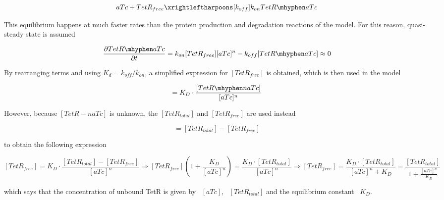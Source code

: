\begin{equation}
    aTc + TetR_{free} \xrightleftharpoons[k_{off}]{k_{on}} TetR \mhyphen aTc
\end{equation}

This equilibrium happens at much faster rates than the protein production and degradation reactions of the model.
For this reason, quasi-steady state is assumed

\begin{equation}
    \pdv{TetR \mhyphen aTc}{t} = k_{on}[TetR_{free}][aTc]^n - k_{off}[TetR \mhyphen aTc] \approx 0
\end{equation}


By rearranging terms and using $K_{d} = k_{off}/k_{on}$, a simplified expression for $[TetR_{free}]$ is obtained,
which is then used in the model

\begin{equation}
[TetR_{free}] = K_{D}\cdot \frac{[TetR \mhyphen naTc]}{[aTc]^n}
\end{equation}

However, because $[TetR-naTc]$ is unknown, the $[TetR_{total}]$ and $[TetR_{free}]$ are used instead

\begin{equation}
[TetR \mhyphen naTc] = [TetR_{total}] - [TetR_{free}]
\end{equation}

to obtain the following expression

\begin{subequations}
    \begin{equation}
    [TetR_{free}] = K_{D} \cdot \frac{[TetR_{total}] - [TetR_{free}]}{[aTc]^n} \Longrightarrow
    \end{equation}
    \begin{equation}
    [TetR_{free}] (1+\frac{K_{D}}{[aTc]^n}) = \frac{K_{D}\cdot [TetR_{total}]}{[aTc]^n}\Longrightarrow
    \end{equation}
    \begin{equation}
    [TetR_{free}] = \frac{K_{D}\cdot[TetR_{total}]}{[aTc]^n+K_{D}} = \frac{[TetR_{total}]}{1+\frac{[aTc]^n}{K_{D}}}
    \end{equation}
\end{subequations}

which says that the concentration of unbound TetR is given by ~$[aTc]$,
~$[TetR_{total}]$ and the equilibrium constant ~$K_{D}$.

